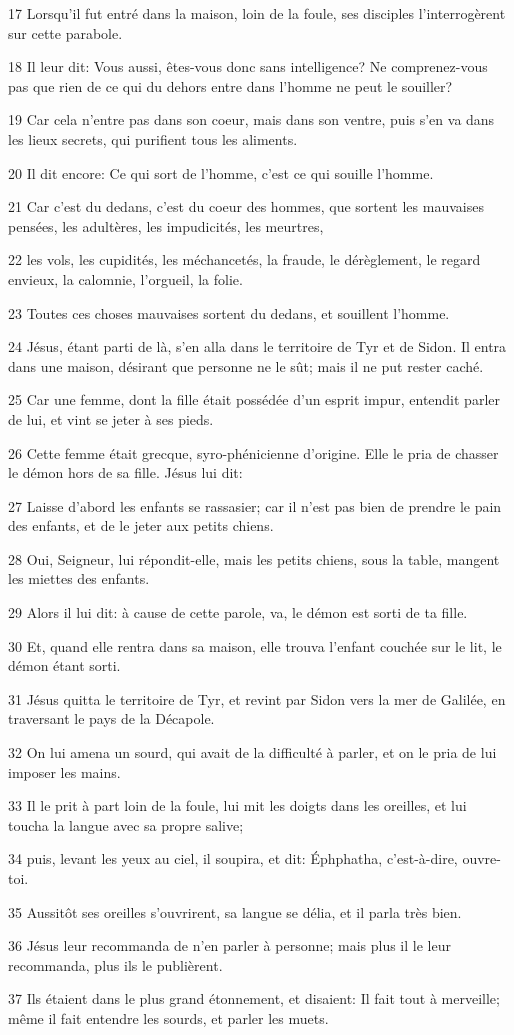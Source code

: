 \par 17 Lorsqu'il fut entré dans la maison, loin de la foule, ses disciples l'interrogèrent sur cette parabole.
\par 18 Il leur dit: Vous aussi, êtes-vous donc sans intelligence? Ne comprenez-vous pas que rien de ce qui du dehors entre dans l'homme ne peut le souiller?
\par 19 Car cela n'entre pas dans son coeur, mais dans son ventre, puis s'en va dans les lieux secrets, qui purifient tous les aliments.
\par 20 Il dit encore: Ce qui sort de l'homme, c'est ce qui souille l'homme.
\par 21 Car c'est du dedans, c'est du coeur des hommes, que sortent les mauvaises pensées, les adultères, les impudicités, les meurtres,
\par 22 les vols, les cupidités, les méchancetés, la fraude, le dérèglement, le regard envieux, la calomnie, l'orgueil, la folie.
\par 23 Toutes ces choses mauvaises sortent du dedans, et souillent l'homme.
\par 24 Jésus, étant parti de là, s'en alla dans le territoire de Tyr et de Sidon. Il entra dans une maison, désirant que personne ne le sût; mais il ne put rester caché.
\par 25 Car une femme, dont la fille était possédée d'un esprit impur, entendit parler de lui, et vint se jeter à ses pieds.
\par 26 Cette femme était grecque, syro-phénicienne d'origine. Elle le pria de chasser le démon hors de sa fille. Jésus lui dit:
\par 27 Laisse d'abord les enfants se rassasier; car il n'est pas bien de prendre le pain des enfants, et de le jeter aux petits chiens.
\par 28 Oui, Seigneur, lui répondit-elle, mais les petits chiens, sous la table, mangent les miettes des enfants.
\par 29 Alors il lui dit: à cause de cette parole, va, le démon est sorti de ta fille.
\par 30 Et, quand elle rentra dans sa maison, elle trouva l'enfant couchée sur le lit, le démon étant sorti.
\par 31 Jésus quitta le territoire de Tyr, et revint par Sidon vers la mer de Galilée, en traversant le pays de la Décapole.
\par 32 On lui amena un sourd, qui avait de la difficulté à parler, et on le pria de lui imposer les mains.
\par 33 Il le prit à part loin de la foule, lui mit les doigts dans les oreilles, et lui toucha la langue avec sa propre salive;
\par 34 puis, levant les yeux au ciel, il soupira, et dit: Éphphatha, c'est-à-dire, ouvre-toi.
\par 35 Aussitôt ses oreilles s'ouvrirent, sa langue se délia, et il parla très bien.
\par 36 Jésus leur recommanda de n'en parler à personne; mais plus il le leur recommanda, plus ils le publièrent.
\par 37 Ils étaient dans le plus grand étonnement, et disaient: Il fait tout à merveille; même il fait entendre les sourds, et parler les muets.

